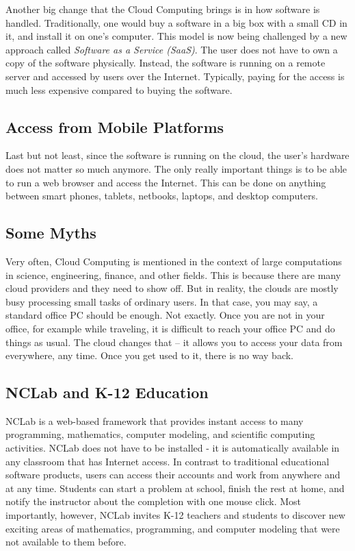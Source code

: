 \documentclass[article,A4,12pt]{llncs}
\begin{document}
Another big change that the Cloud Computing brings is in how software is handled. 
Traditionally, one would buy a software in a big box with a small CD in it, 
and install it on one's computer. This model is now being challenged by a new 
approach called {\em Software as a Service (SaaS)}. The user does not have 
to own a copy of the software physically. Instead, the software is running 
on a remote server and accessed by users over the Internet. Typically, paying 
for the access is much less expensive compared to buying the software.

\subsection{Access from Mobile Platforms}

Last but not least, since the software is running on the cloud, the user's hardware 
does not matter so much anymore. The only really important things is to be able to 
run a web browser and access the Internet. This can be done on anything between smart 
phones, tablets, netbooks, laptops, and desktop computers. 

\subsection{Some Myths}

Very often, Cloud Computing is mentioned in the context of large 
computations in science, engineering, finance, and other fields. This is because there are many 
cloud providers and they need to show off. But in reality, the clouds are mostly
busy processing small tasks of ordinary users. In that case, you may say, a standard 
office PC should be enough. Not exactly. Once you are not in your office, for example
while traveling, it is difficult to reach your office PC and do things as usual. 
The cloud changes that -- it allows you to access your data 
from everywhere, any time. Once you get used to it, there is no way back. 

\subsection{NCLab and K-12 Education}

NCLab is a web-based framework that provides 
instant access to many programming, mathematics, computer
modeling, and scientific computing activities. NCLab does not have to be installed - it 
is automatically available in any classroom that has Internet access. In 
contrast to traditional educational software products, 
users can access their accounts and work from anywhere and at any time.
Students can start a problem at school, finish the rest at home, and notify 
the instructor about the completion with one mouse click. Most importantly, 
however, NCLab invites K-12 teachers and students to discover new exciting 
areas of mathematics, programming, and computer modeling that were not 
available to them before.
\end{document}

